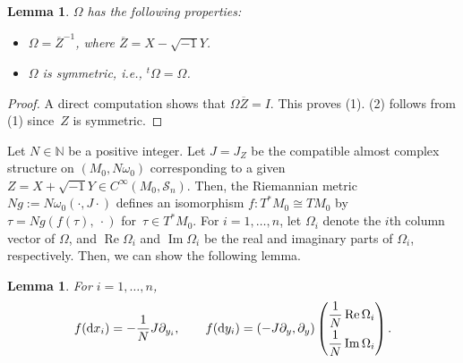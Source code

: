 \documentclass[10pt,a4paper]{amsart}
\numberwithin{equation}{section}
\newtheorem{Lemma}[Theorem]{Lemma}
\newcommand{\N}{\mathbb{N}}
\def\re{\operatorname{Re}}
\def\im{\operatorname{Im}}
\begin{document}
\begin{Lemma}\label{property of Omega} $\Omega$ has the following properties:
\begin{itemize}\itemsep=0pt
\item[$(1)$] $\Omega={\overline Z}^{-1}$, where ${\overline Z}=X-\sqrt{-1}Y$.
\item[$(2)$] $\Omega$ is symmetric, i.e., ${}^t\Omega=\Omega$.
\end{itemize}
\end{Lemma}
\begin{proof}
A direct computation shows that $\Omega{\overline Z}=I$. This proves (1). (2) follows from (1) since~$Z$ is symmetric.
\end{proof}

Let $N\in \N$ be a positive integer. Let $J=J_Z$ be the compatible almost complex structure on $(M_0,N\omega_0)$ corresponding to a given $Z=X+\sqrt{-1}Y\in C^\infty ( M_0,{\mathcal S}_n)$. Then, the Riemannian metric $Ng:=N\omega_0 (\cdot , J\cdot )$ defines an isomorphism $f\colon T^*M_0\cong TM_0$ by $\tau=Ng\left( f(\tau),\ \cdot \right)$ for~${\tau \in T^*M_0}$. For $i=1,\ldots ,n$, let $\Omega_i$ denote the $i$th column vector of $\Omega$, and $\re\Omega_i$ and $\im\Omega_i$ be the real and imaginary parts of $\Omega_i$, respectively. Then, we can show the following lemma.
\begin{Lemma}\label{dual}
For $i=1,\ldots ,n$,
\[
f({\rm d}x_i)=-\frac{1}{N}J\partial_{y_i},\qquad f({\rm d}y_i)=(-J\partial_y, \partial_y)
\begin{pmatrix}
\dfrac{1}{N}\re\Omega_i \vspace{1mm}\\
\dfrac{1}{N}\im\Omega_i
\end{pmatrix}.
\]
\end{Lemma}
\end{document}
